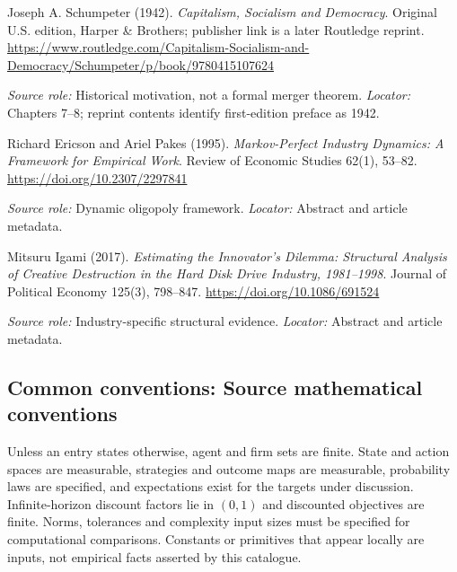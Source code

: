 \documentclass[11pt,a4paper]{article}
\begin{document}
\begin{enumerate}[label={[S\arabic*]},leftmargin=*]

\item Joseph A. Schumpeter (1942). \emph{Capitalism, Socialism and Democracy}. Original U.S. edition, Harper \& Brothers; publisher link is a later Routledge reprint. \url{https://www.routledge.com/Capitalism-Socialism-and-Democracy/Schumpeter/p/book/9780415107624}\par \textit{Source role:} Historical motivation, not a formal merger theorem. \textit{Locator:} Chapters 7--8; reprint contents identify first-edition preface as 1942.

\item Richard Ericson and Ariel Pakes (1995). \emph{Markov-Perfect Industry Dynamics: A Framework for Empirical Work}. Review of Economic Studies 62(1), 53--82. \url{https://doi.org/10.2307/2297841}\par \textit{Source role:} Dynamic oligopoly framework. \textit{Locator:} Abstract and article metadata.

\item Mitsuru Igami (2017). \emph{Estimating the Innovator's Dilemma: Structural Analysis of Creative Destruction in the Hard Disk Drive Industry, 1981--1998}. Journal of Political Economy 125(3), 798--847. \url{https://doi.org/10.1086/691524}\par \textit{Source role:} Industry-specific structural evidence. \textit{Locator:} Abstract and article metadata.

\end{enumerate}

\subsection*{Common conventions: Source mathematical conventions}

Unless an entry states otherwise, agent and firm sets are finite. State and action spaces are measurable, strategies and outcome maps are measurable, probability laws are specified, and expectations exist for the targets under discussion. Infinite-horizon discount factors lie in $(0,1)$ and discounted objectives are finite. Norms, tolerances and complexity input sizes must be specified for computational comparisons. Constants or primitives that appear locally are inputs, not empirical facts asserted by this catalogue.
\end{document}
